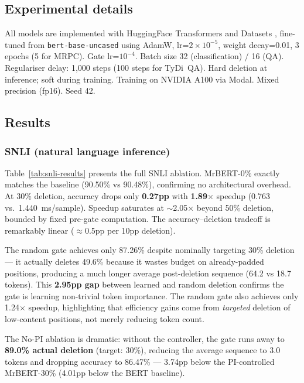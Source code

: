 \documentclass{article} %
\begin{document}
\subsection{Experimental details}

All models are implemented with HuggingFace Transformers \citep{wolf2020transformers} and Datasets \citep{lhoest2021datasets}, fine-tuned from \texttt{bert-base-uncased} using AdamW, lr=$2\times10^{-5}$, weight decay=0.01, 3 epochs (5 for MRPC). Gate lr=$10^{-4}$. Batch size 32 (classification) / 16 (QA). Regulariser delay: 1,000 steps (100 steps for TyDi~QA). Hard deletion at inference; soft during training. Training on NVIDIA A100 via Modal. Mixed precision (fp16). Seed 42.


\subsection{Results}

\subsubsection{SNLI (natural language inference)}
\label{sec:results-snli}

Table~\ref{tab:snli-results} presents the full SNLI ablation. MrBERT-0\% exactly matches the baseline (90.50\% vs 90.48\%), confirming no architectural overhead. At 30\% deletion, accuracy drops only \textbf{0.27pp} with \textbf{1.89$\times$} speedup (0.763 vs.\ 1.440~ms/sample). Speedup saturates at $\sim$2.05$\times$ beyond 50\% deletion, bounded by fixed pre-gate computation. The accuracy--deletion tradeoff is remarkably linear ($\approx$0.5pp per 10pp deletion).

The random gate achieves only 87.26\% despite nominally targeting 30\% deletion --- it actually deletes 49.6\% because it wastes budget on already-padded positions, producing a much longer average post-deletion sequence (64.2 vs 18.7 tokens). This \textbf{2.95pp gap} between learned and random deletion confirms the gate is learning non-trivial token importance. The random gate also achieves only 1.24$\times$ speedup, highlighting that efficiency gains come from \emph{targeted} deletion of low-content positions, not merely reducing token count.

The No-PI ablation is dramatic: without the controller, the gate runs away to \textbf{89.0\% actual deletion} (target: 30\%), reducing the average sequence to 3.0 tokens and dropping accuracy to 86.47\% --- 3.74pp below the PI-controlled MrBERT-30\% (4.01pp below the BERT baseline).
\end{document}
